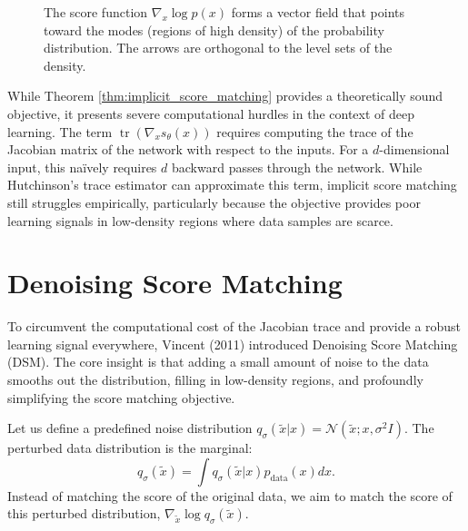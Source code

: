 \begin{figure}[htbp]
\centering
{}
\caption{The score function $\nabla_x \log p(x)$ forms a vector field that points toward the modes (regions of high density) of the probability distribution. The arrows are orthogonal to the level sets of the density.}
\label{fig:score_field}
\end{figure}

While Theorem \ref{thm:implicit_score_matching} provides a theoretically sound objective, it presents severe computational hurdles in the context of deep learning. The term $\operatorname{tr}(\nabla_x s_\theta(x))$ requires computing the trace of the Jacobian matrix of the network with respect to the inputs. For a $d$-dimensional input, this naïvely requires $d$ backward passes through the network. While Hutchinson's trace estimator can approximate this term, implicit score matching still struggles empirically, particularly because the objective provides poor learning signals in low-density regions where data samples are scarce.

\section{Denoising Score Matching}

To circumvent the computational cost of the Jacobian trace and provide a robust learning signal everywhere, Vincent (2011) introduced Denoising Score Matching (DSM). The core insight is that adding a small amount of noise to the data smooths out the distribution, filling in low-density regions, and profoundly simplifying the score matching objective.

Let us define a predefined noise distribution $q_\sigma(\tilde{x}|x) = \mathcal{N}(\tilde{x}; x, \sigma^2 I)$. The perturbed data distribution is the marginal:
\begin{equation}
    q_\sigma(\tilde{x}) = \int q_\sigma(\tilde{x}|x) p_{\text{data}}(x) dx.
\end{equation}
Instead of matching the score of the original data, we aim to match the score of this perturbed distribution, $\nabla_{\tilde{x}} \log q_\sigma(\tilde{x})$.

